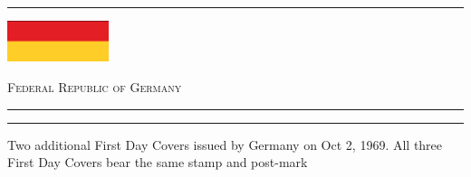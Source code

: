 \documentclass[a4paper]{article}
\begin{document}
\hrule
\vspace{8pt}
\begin{minipage}{2cm}
  \includegraphics[height=1.2cm]{images/de}
\end{minipage}
\hfill
{\scshape\huge Federal Republic of Germany}
\vspace{8pt}
\hrule
\vspace{21cm}
\begin{center}
  \begin{minipage}{12cm} \hrule \vspace{12pt} Two additional First Day
    Covers issued by Germany on Oct 2, 1969. All three First Day
    Covers bear the same stamp and post-mark
  \end{minipage}
\end{center}
\end{document}

